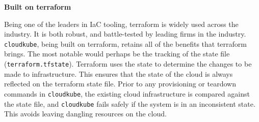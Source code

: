 \newpage
\textbf{Built on terraform}

Being one of the leaders in IaC tooling, terraform is widely used across the industry. It is both robust, and battle-tested by leading firms in the industry. \texttt{cloudkube}, being built on terraform, retains all of the benefits that terraform brings. The most notable would perhaps be the tracking of the state file (\texttt{terraform.tfstate}). Terraform uses the state to determine the changes to be made to infrastructure. This ensures that the state of the cloud is always reflected on the terraform state file. Prior to any provisioning or teardown commands in \texttt{cloudkube}, the existing cloud infrastructure is compared against the state file, and \texttt{cloudkube} fails safely if the system is in an inconsistent state. This avoids leaving dangling resources on the cloud. 